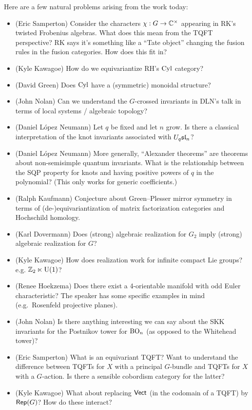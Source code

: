\documentclass{amsart}
\begin{document}
Here are a few natural problems arising from the work today:
\begin{itemize}
  \item (Eric Samperton) Consider the characters $\chi: G \to \CC^\times$ appearing in RK's twisted Frobenius algebras.
    What does this mean from the TQFT perspective?
    RK says it's something like a ``Tate object'' changing the fusion rules in the fusion categories.
    How does this fit in?
  \item (Kyle Kawagoe) How do we equivariantize RH's $\Cyl$ category?
  \item (David Green) Does $\Cyl$ have a (symmetric) monoidal structure?
  \item (John Nolan) Can we understand the $G$-crossed invariants in DLN's talk in terms of local systems / algebraic topology?
  \item (Daniel L\'opez Neumann) Let $q$ be fixed and let $n$ grow.
    Is there a classical interpretation of the knot invariants associated with $U_q \sl_n$?
  \item (Daniel L\'opez Neumann) More generally, ``Alexander theorems'' are theorems about non-semisimple quantum invariants.
    What is the relationship between the SQP property for knots and having positive powers of $q$ in the polynomial?
    (This only works for generic coefficients.)
  \item (Ralph Kaufmann) Conjecture about Green--Plesser mirror symmetry in terms of (de-)equivariantization of matrix factorization categories and Hochschild homology.
  \item (Karl Dovermann) Does (strong) algebraic realization for $G_2$ imply (strong) algebraic realization for $G$?
  \item (Kyle Kawagoe) How does realization work for infinite compact Lie groups? e.g. $\ZZ_2 \ltimes \Urm(1)$?
  \item (Renee Hoekzema) Does there exist a 4-orientable manifold with odd Euler characteristic?
    The speaker has some specific examples in mind (e.g.\ Rosenfeld projective planes).
  \item (John Nolan) Is there anything interesting we can say about the SKK invariants for the Postnikov tower for $\BO_n$ (as opposed to the Whitehead tower)?
  \item (Eric Samperton) What is an equivariant TQFT?
    Want to understand the difference between TQFTs for $X$ with a principal $G$-bundle and TQFTs for $X$ with a $G$-action.
    Is there a sensible cobordism category for the latter?
  \item (Kyle Kawagoe) What about replacing $\Vect$ (in the codomain of a TQFT) by $\Rep(G)$?
    How do these interact?
\end{itemize}
\end{document}
